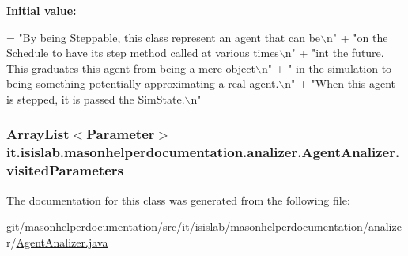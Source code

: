 {\bfseries Initial value\-:}
\begin{DoxyCode}
= \textcolor{stringliteral}{"By being Steppable, this class represent an agent that can be\(\backslash\)n"}
            + \textcolor{stringliteral}{"on the Schedule to have its step method called at various times\(\backslash\)n"}
            + \textcolor{stringliteral}{"int the future. This graduates this agent from being a mere object\(\backslash\)n"}
            + \textcolor{stringliteral}{" in the simulation to being something potentially approximating a real agent.\(\backslash\)n"}
            + \textcolor{stringliteral}{"When this agent is stepped, it is passed the SimState.\(\backslash\)n"}
\end{DoxyCode}
\hypertarget{classit_1_1isislab_1_1masonhelperdocumentation_1_1analizer_1_1_agent_analizer_a631132645fb74a4498f033579556efa9}{
\subsubsection[{visited\-Parameters}]{\setlength{\rightskip}{0pt plus 5cm}Array\-List$<${\bf Parameter}$>$ it.\-isislab.\-masonhelperdocumentation.\-analizer.\-Agent\-Analizer.\-visited\-Parameters\hspace{0.3cm}{\ttfamily [private]}}}\label{classit_1_1isislab_1_1masonhelperdocumentation_1_1analizer_1_1_agent_analizer_a631132645fb74a4498f033579556efa9}


The documentation for this class was generated from the following file\-:\begin{DoxyCompactItemize}
\item 
git/masonhelperdocumentation/src/it/isislab/masonhelperdocumentation/analizer/\hyperlink{_agent_analizer_8java}{Agent\-Analizer.\-java}\end{DoxyCompactItemize}
